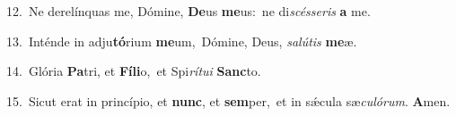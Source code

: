 {\numbfont\textcolor{\numbcolor}{12.}}~Ne derelínquas me, Dómine, \textbf{De}\-us \textbf{me}\-us:~\star ne di\-\textit{scés}\-\textit{se}\textit{ris} \textbf{a} me.\par
{\numbfont\textcolor{\numbcolor}{13.}}~Inténde in adju\-\textbf{tó}\-rium \textbf{me}\-um,~\star Dómine, Deus, \textit{sa}\-\textit{lú}\textit{tis} \textbf{me}\-æ.\par
{\numbfont\textcolor{\numbcolor}{14.}}~Glória \textbf{Pa}\-tri, et \textbf{Fí}\-\textbf{li}o,~\star et Spi\-\textit{rí}\-\textit{tu}\textit{i} \textbf{Sanc}\-to.\par
{\numbfont\textcolor{\numbcolor}{15.}}~Sicut erat in princípio, et \textbf{nunc}\-, et \textbf{sem}\-per,~\star et in sǽcula sæ\-\textit{cu}\-\textit{ló}\textit{rum}. \textbf{A}\-men.\par

